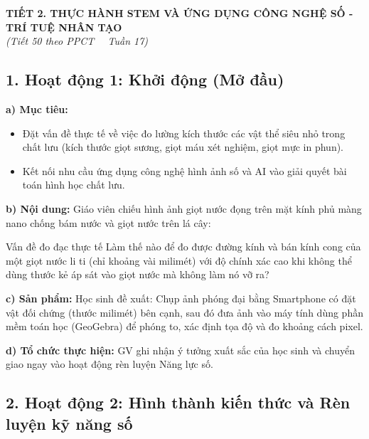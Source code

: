 \documentclass[12pt, a4paper]{article}
\begin{document}
\vspace{10pt}
\begin{center}
    {\fontsize{13pt}{16pt}\selectfont \textbf{TIẾT 2. THỰC HÀNH STEM VÀ ỨNG DỤNG CÔNG NGHỆ SỐ - TRÍ TUỆ NHÂN TẠO}}\\[2pt]
    \textit{(Tiết 50 theo PPCT \ \textbar \ Tuần 17)}
\end{center}

\subsection*{1. Hoạt động 1: Khởi động (Mở đầu)}

\noindent \textbf{a) Mục tiêu:}
\begin{itemize}
    \item Đặt vấn đề thực tế về việc đo lường kích thước các vật thể siêu nhỏ trong chất lưu (kích thước giọt sương, giọt máu xét nghiệm, giọt mực in phun).
    \item Kết nối nhu cầu ứng dụng công nghệ hình ảnh số và AI vào giải quyết bài toán hình học chất lưu.
\end{itemize}

\noindent \textbf{b) Nội dung:}
Giáo viên chiếu hình ảnh giọt nước đọng trên mặt kính phủ màng nano chống bám nước và giọt nước trên lá cây:
\begin{pedabox}{Vấn đề đo đạc thực tế}
    Làm thế nào để đo được đường kính và bán kính cong của một giọt nước li ti (chỉ khoảng vài milimét) với độ chính xác cao khi không thể dùng thước kẻ áp sát vào giọt nước mà không làm nó vỡ ra?
\end{pedabox}

\noindent \textbf{c) Sản phẩm:}
Học sinh đề xuất: Chụp ảnh phóng đại bằng Smartphone có đặt vật đối chứng (thước milimét) bên cạnh, sau đó đưa ảnh vào máy tính dùng phần mềm toán học (GeoGebra) để phóng to, xác định tọa độ và đo khoảng cách pixel.

\noindent \textbf{d) Tổ chức thực hiện:}
GV ghi nhận ý tưởng xuất sắc của học sinh và chuyển giao ngay vào hoạt động rèn luyện Năng lực số.

\subsection*{2. Hoạt động 2: Hình thành kiến thức và Rèn luyện kỹ năng số}
\end{document}
